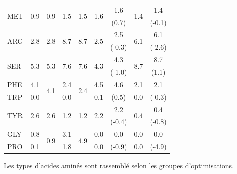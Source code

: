 \begin{table}
\begin{tabular}{lcccc|cccc}
\hline                                                                        
\multirow{2}{*}{MET}&\multirow{2}{*}{0.9}&\multirow{2}{*}{0.9}&\multirow{2}{*}{1.5}&\multirow{2}{*}{1.5}&\multirow{2}{*}{1.6}&1.6&\multirow{2}{*}{1.4}&1.4\\
&&&&&&(0.7)&&(-0.1)\\
\hline                                                                         
\multirow{2}{*}{ARG}&\multirow{2}{*}{2.8}&\multirow{2}{*}{2.8}&\multirow{2}{*}{8.7}&\multirow{2}{*}{8.7}&\multirow{2}{*}{2.5}&2.5&\multirow{2}{*}{6.1}&6.1\\
&&&&&&(-0.3)&&(-2.6)\\
\hline                                                                                  
\multirow{2}{*}{SER} &\multirow{2}{*}{5.3}&\multirow{2}{*}{5.3}&\multirow{2}{*}{7.6}&\multirow{2}{*}{7.6}&\multirow{2}{*}{4.3}&4.3&\multirow{2}{*}{8.7}&8.7\\
&&&&&&(-1.0)&&(1.1)\\
\hline                                                         
PHE      &4.1&\multirow{2}{*}{4.1}&2.4&\multirow{2}{*}{2.4}&4.5&\multirow{1}{*}{4.6}&2.1&\multirow{1}{*}{2.1}\\
TRP&0.0&&0.0&&0.1&(0.5)&0.0&(-0.3)\\
\hline                                                                                                                                                                                   
\multirow{2}{*}{TYR}&\multirow{2}{*}{2.6}&\multirow{2}{*}{2.6}&\multirow{2}{*}{1.2}&\multirow{2}{*}{1.2}&\multirow{2}{*}{2.2}&2.2&\multirow{2}{*}{0.4}&0.4\\
&&&&&&(-0.4)&&(-0.8)\\
\hline                                                                                                                                                                            
GLY&0.8&\multirow{2}{*}{0.9}&3.1&\multirow{2}{*}{4.9}&0.0&\multirow{1}{*}{0.0}&0.0&\multirow{1}{*}{0.0}\\
PRO&0.1&&1.8&&0.0&(-0.9)&0.0&(-4.9)\\
\hline
\end{tabular}
{\footnotesize Les types d'acides aminés sont rassemblé selon les groupes d'optimisations.}
\label{Tab:FreqAA6}
\end{table}



